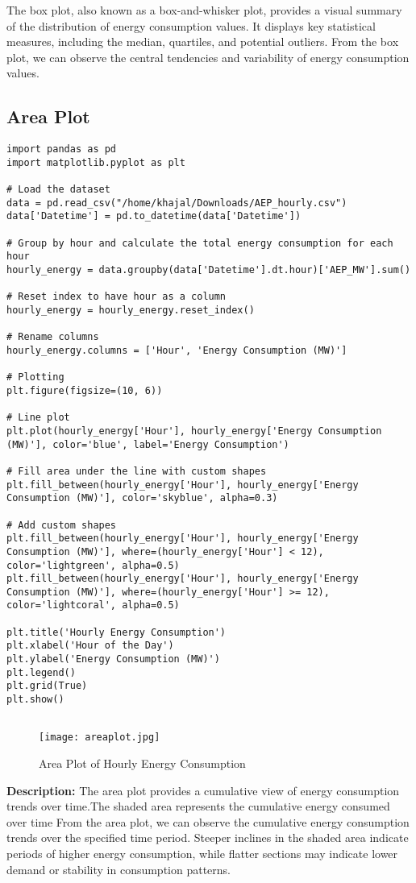 \documentclass{article}
\begin{document}
The box plot, also known as a box-and-whisker plot, provides a visual summary of the distribution of energy consumption values. It displays key statistical measures, including the median, quartiles, and potential outliers. From the box plot, we can observe the central tendencies and variability of energy consumption values.
\subsection{Area Plot}
\begin{lstlisting}[caption={Python code for AreaPlot}]
import pandas as pd
import matplotlib.pyplot as plt

# Load the dataset
data = pd.read_csv("/home/khajal/Downloads/AEP_hourly.csv")
data['Datetime'] = pd.to_datetime(data['Datetime'])

# Group by hour and calculate the total energy consumption for each hour
hourly_energy = data.groupby(data['Datetime'].dt.hour)['AEP_MW'].sum()

# Reset index to have hour as a column
hourly_energy = hourly_energy.reset_index()

# Rename columns
hourly_energy.columns = ['Hour', 'Energy Consumption (MW)']

# Plotting
plt.figure(figsize=(10, 6))

# Line plot
plt.plot(hourly_energy['Hour'], hourly_energy['Energy Consumption (MW)'], color='blue', label='Energy Consumption')

# Fill area under the line with custom shapes
plt.fill_between(hourly_energy['Hour'], hourly_energy['Energy Consumption (MW)'], color='skyblue', alpha=0.3)

# Add custom shapes
plt.fill_between(hourly_energy['Hour'], hourly_energy['Energy Consumption (MW)'], where=(hourly_energy['Hour'] < 12), color='lightgreen', alpha=0.5)
plt.fill_between(hourly_energy['Hour'], hourly_energy['Energy Consumption (MW)'], where=(hourly_energy['Hour'] >= 12), color='lightcoral', alpha=0.5)

plt.title('Hourly Energy Consumption')
plt.xlabel('Hour of the Day')
plt.ylabel('Energy Consumption (MW)')
plt.legend()
plt.grid(True)
plt.show()


\end{lstlisting}

\begin{figure}[H]
    \centering
    \texttt{[image: areaplot.jpg]}
    \caption{Area Plot of Hourly Energy Consumption}
    \label{fig:Area_plot}
\end{figure}
\textbf{Description:}
The area plot provides a cumulative view of energy consumption trends over time.The shaded area represents the cumulative energy consumed over time
From the area plot, we can observe the cumulative energy consumption trends over the specified time period. Steeper inclines in the shaded area indicate periods of higher energy consumption, while flatter sections may indicate lower demand or stability in consumption patterns.
\end{document}
